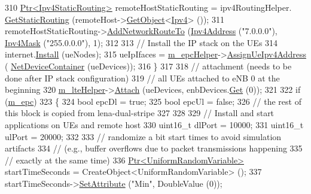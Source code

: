 \begin{DoxyCode}
310       \hyperlink{classns3_1_1Ptr}{Ptr<Ipv4StaticRouting>} remoteHostStaticRouting = ipv4RoutingHelper.
      \hyperlink{classns3_1_1Ipv4StaticRoutingHelper_a731206e50d305695dac7fb2ef963a4bb}{GetStaticRouting} (remoteHost->\hyperlink{classns3_1_1Object_a13e18c00017096c8381eb651d5bd0783}{GetObject}<\hyperlink{classns3_1_1Ipv4}{Ipv4}> ());
311       remoteHostStaticRouting->\hyperlink{classns3_1_1Ipv4StaticRouting_a8bf5eaa7ba49fe33c78c70d5560b6c39}{AddNetworkRouteTo} (\hyperlink{classns3_1_1Ipv4Address}{Ipv4Address} (\textcolor{stringliteral}{"7.0.0.0"}), 
      \hyperlink{classns3_1_1Ipv4Mask}{Ipv4Mask} (\textcolor{stringliteral}{"255.0.0.0"}), 1);
312 
313       \textcolor{comment}{// Install the IP stack on the UEs}
314       internet.\hyperlink{classns3_1_1InternetStackHelper_a6645b412f31283d2d9bc3d8a95cebbc0}{Install} (ueNodes);
315       ueIpIfaces = \hyperlink{classLteX2HandoverMeasuresTestCase_a1ed4aafe2190532479d857923d423d54}{m\_epcHelper}->\hyperlink{classns3_1_1PointToPointEpcHelper_a11102d32127163fdcc47c44623d4f0cc}{AssignUeIpv4Address} (
      \hyperlink{classns3_1_1NetDeviceContainer}{NetDeviceContainer} (ueDevices));
316     \}
317 
318   \textcolor{comment}{// attachment (needs to be done after IP stack configuration)}
319   \textcolor{comment}{// all UEs attached to eNB 0 at the beginning}
320   \hyperlink{classLteX2HandoverMeasuresTestCase_a5d9f434c242eb81dba2d8e99c43e7046}{m\_lteHelper}->\hyperlink{classns3_1_1LteHelper_a9466743f826aa2652a87907b7f0a1c87}{Attach} (ueDevices, enbDevices.\hyperlink{classns3_1_1NetDeviceContainer_a677d62594b5c9d2dea155cc5045f4d0b}{Get} (0));
321 
322   \textcolor{keywordflow}{if} (\hyperlink{classLteX2HandoverMeasuresTestCase_aa8fbf977c7cbd51e34d1943b4cd60aef}{m\_epc})
323     \{
324       \textcolor{keywordtype}{bool} epcDl = \textcolor{keyword}{true};
325       \textcolor{keywordtype}{bool} epcUl = \textcolor{keyword}{false};
326       \textcolor{comment}{// the rest of this block is copied from lena-dual-stripe}
327 
328 
329       \textcolor{comment}{// Install and start applications on UEs and remote host}
330       uint16\_t dlPort = 10000;
331       uint16\_t ulPort = 20000;
332 
333       \textcolor{comment}{// randomize a bit start times to avoid simulation artifacts}
334       \textcolor{comment}{// (e.g., buffer overflows due to packet transmissions happening}
335       \textcolor{comment}{// exactly at the same time)}
336       \hyperlink{classns3_1_1Ptr}{Ptr<UniformRandomVariable>} startTimeSeconds = 
      CreateObject<UniformRandomVariable> ();
337       startTimeSeconds->\hyperlink{classns3_1_1ObjectBase_ac60245d3ea4123bbc9b1d391f1f6592f}{SetAttribute} (\textcolor{stringliteral}{"Min"}, DoubleValue (0));

\end{DoxyCode}
